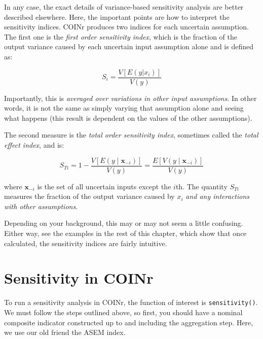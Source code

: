 \documentclass[
]{book}
\begin{document}
In any case, the exact details of variance-based sensitivity analysis are better described elsewhere. Here, the important points are how to interpret the sensitivity indices. COINr produces two indices for each uncertain assumption. The first one is the \emph{first order sensitivity index}, which is the fraction of the output variance caused by each uncertain input assumption alone and is defined as:

\[ S_i = \frac{V[E(y|x_i)]}{V(y)} \]

Importantly, this is \emph{averaged over variations in other input assumptions}. In other words, it is not the same as simply varying that assumption alone and seeing what happens (this result is dependent on the values of the other assumptions).

The second measure is the \emph{total order sensitivity index}, sometimes called the \emph{total effect index}, and is:

\[ S_{Ti} = 1 - \frac {V[E\left(y \mid \textbf{x}_{-i} \right)]}{V(y)} = \frac {E[V\left(y \mid
    \textbf{x}_{-i} \right)]}{V(y)}  \]

where \(\textbf{x}_{-i}\) is the set of all uncertain inputs except the \(i\)th. The quantity \(S_{Ti}\) measures the fraction of the output variance caused by \(x_i\) \emph{and any interactions with other assumptions}.

Depending on your background, this may or may not seem a little confusing. Either way, see the examples in the rest of this chapter, which show that once calculated, the sensitivity indices are fairly intuitive.

\hypertarget{sensitivity-in-coinr}{%
\section{Sensitivity in COINr}\label{sensitivity-in-coinr}}

To run a sensitivity analysis in COINr, the function of interest is \texttt{sensitivity()}. We must follow the steps outlined above, so first, you should have a nominal composite indicator constructed up to and including the aggregation step. Here, we use our old friend the ASEM index.
\end{document}
